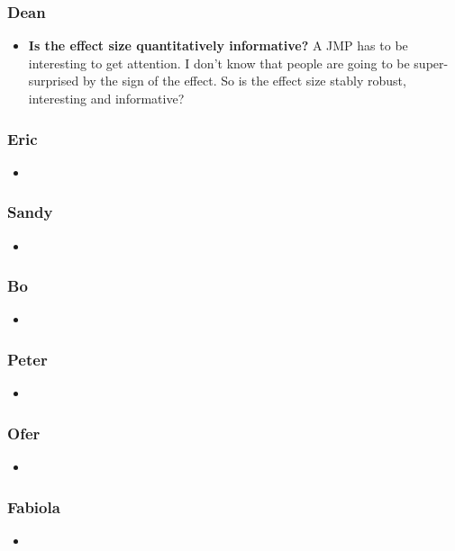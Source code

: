 \documentclass{beamer}
\begin{document}
\begin{frame}
        \label{frame:dean3}
    \frametitle{Dean}
    \begin{itemize}
        \item \textbf{Is the effect size quantitatively informative?}   A JMP has to be interesting to get attention. I don’t know that people are going to be super-surprised by the sign of the effect. So is the effect size stably robust, interesting and informative?
    \end{itemize}
\end{frame}

\begin{frame}
        \label{frame:Eric}
    \frametitle{Eric}
    \begin{itemize}
        \item 
    \end{itemize}
\end{frame}

\begin{frame}
        \label{frame:Sandy}
    \frametitle{Sandy}
    \begin{itemize}
        \item 
    \end{itemize}
\end{frame}

\begin{frame}
        \label{frame:Bo}
    \frametitle{Bo}
    \begin{itemize}
        \item 
    \end{itemize}
\end{frame}

\begin{frame}
        \label{frame:Peter}
    \frametitle{Peter}
    \begin{itemize}
        \item 
    \end{itemize}
\end{frame}

\begin{frame}
        \label{frame:Ofer}
    \frametitle{Ofer}
    \begin{itemize}
        \item 
    \end{itemize}
\end{frame}

\begin{frame}
    \label{frame:fabiola}
    \frametitle{Fabiola}
    \begin{itemize}
        \item 
    \end{itemize}
\end{frame}
\end{document}
